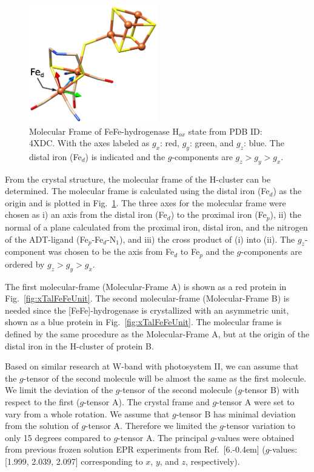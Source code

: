 \begin{figure}[ht]
 \centering
 \includegraphics[width=0.5\textwidth]{Kapitel/Ch1-images/Ch2-MolFrame.eps}
 \caption[Molecular Frame of FeFe-hydrogenase H$_{ox}$ state.]{Molecular Frame of FeFe-hydrogenase H$_{ox}$ state from PDB ID: 4XDC. With the axes labeled as $g_x$: red, $g_y$: green, and $g_z$: blue. The distal iron (Fe$_d$) is indicated and the $g$-components are $g_z>g_y>g_x$.}
 \label{fig:MolecularFrame}
\end{figure}

From the crystal structure, the molecular frame of the H-cluster can be determined. The molecular frame is calculated using the distal iron (Fe$_d$) as the origin and is plotted in Fig.~\ref{fig:MolecularFrame}. The three axes for the molecular frame were chosen as i) an axis from the distal iron (Fe$_d$) to the proximal iron (Fe$_p$), ii) the normal of a plane calculated from the proximal iron, distal iron, and the nitrogen of the ADT-ligand  (Fe$_p$-Fe$_d$-N$_1$), and iii) the cross product of (i) into (ii). The $g_z$-component was chosen to be the axis from Fe$_d$ to Fe$_p$ and the $g$-components are ordered by $g_z>g_y>g_x$. 

The first molecular-frame (Molecular-Frame A) is shown as a red protein in Fig.~\ref{fig:xTalFeFeUnit}. The second molecular-frame (Molecular-Frame B) is needed since the [FeFe]-hydrogenase is crystallized with an asymmetric unit, shown as a blue protein in Fig.~\ref{fig:xTalFeFeUnit}. The molecular frame is defined by the same procedure as the Molecular-Frame A, but at the origin of the distal iron in the H-cluster of protein B.

Based on similar research at W-band with photosystem II, we can assume that the $g$-tensor of the second molecule will be almost the same as the first molecule. \cite{Hofbauer6623, B908093G} We limit the deviation of the $g$-tensor of the second molecule ($g$-tensor B) with respect to the first ($g$-tensor A). The crystal frame and $g$-tensor A were set to vary from a whole rotation. We assume that $g$-tensor B has minimal deviation from the solution of $g$-tensor A. Therefore we limited the $g$-tensor variation to only 15 degrees compared to $g$-tensor A. The principal $g$-values were obtained from previous frozen solution EPR experiments from Ref.~[6.\kern-0.4em] ($g$-values: [1.999, 2.039, 2.097] corresponding to $x$, $y$, and $z$, respectively).

